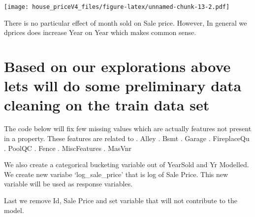 \documentclass[
]{article}
\begin{document}
\texttt{[image: house\_priceV4\_files/figure-latex/unnamed-chunk-13-2.pdf]}

There is no particular effect of month sold on Sale price. However, In
general we dprices does increase Year on Year which makes common sense.

\hypertarget{based-on-our-explorations-above-lets-will-do-some-preliminary-data-cleaning-on-the-train-data-set}{%
\section{Based on our explorations above lets will do some preliminary
data cleaning on the train data
set}\label{based-on-our-explorations-above-lets-will-do-some-preliminary-data-cleaning-on-the-train-data-set}}

The code below will fix few missing values which are actually features
not present in a property. These features are related to . Alley . Bsmt
. Garage . FireplaceQu . PoolQC . Fence . MiscFeatures . MasVnr

We also create a categorical bucketing variable out of YearSold and Yr
Modelled. We create new variabe `log\_sale\_price' that is log of Sale
Price. This new variable will be used as response variables.

Last we remove Id, Sale Price and set variable that will not contribute
to the model.
\end{document}
